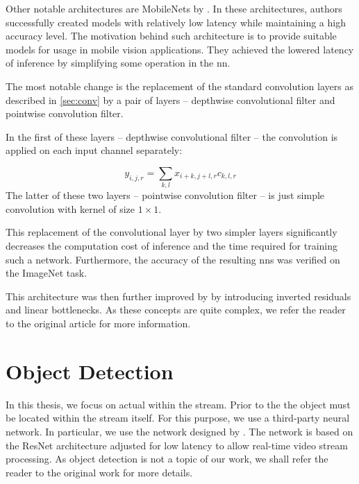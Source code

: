 \label{ssec:mobilenet}

Other notable architectures are MobileNets by \cite{mobilenets}. In these architectures, authors successfully created models with relatively low latency while maintaining a high accuracy level. The motivation behind such architecture is to provide suitable models for usage in mobile vision applications. They achieved the lowered latency of inference by simplifying some operation in the \gls{nn}.

The most notable change is the replacement of the standard convolution layers as described in \autoref{sec:conv} by a pair of layers -- depthwise convolutional filter and pointwise convolution filter.

In the first of these layers -- depthwise convolutional filter -- the convolution is applied on each input channel separately:

$$y_{i, j, r} = \sum_{k, l} x_{i+k, j+l, r} c_{k, l, r}$$
The latter of these two layers -- pointwise convolution filter -- is just simple convolution with kernel of size $1 \times 1$.

This replacement of the convolutional layer by two simpler layers significantly decreases the computation cost of inference and the time required for training such a network. Furthermore, the accuracy of the resulting \glspl{nn} was verified on the ImageNet task. 

This architecture was then further improved by \cite{mobilenetv2} by introducing inverted residuals and linear bottlenecks. As these concepts are quite complex, we refer the reader to the original article for more information.


\section{Object Detection}

In this thesis, we focus on actual \reid{} within the stream. Prior to the \reid{} the object must be located within the stream itself. For this purpose, we use a third-party neural network. In particular, we use the network designed by \cite{dobransky2019}. The network is based on the ResNet architecture adjusted for low latency to allow real-time video stream processing. As object detection is not a topic of our work, we shall refer the reader to the original work for more details.
